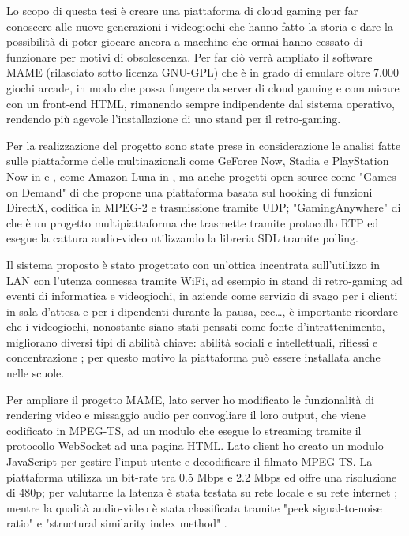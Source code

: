 Lo scopo di questa tesi è creare una piattaforma di cloud gaming per far conoscere alle nuove generazioni i videogiochi che hanno fatto la storia e dare la possibilità di poter giocare ancora a macchine che ormai hanno cessato di funzionare per motivi di obsolescenza. Per far ciò verrà ampliato il software MAME (rilasciato sotto licenza GNU-GPL) che è in grado di emulare oltre 7.000 giochi arcade, in modo che possa fungere da server di cloud gaming e comunicare con un front-end HTML, rimanendo sempre indipendente dal sistema operativo, rendendo più agevole l'installazione di uno stand per il retro-gaming. 

Per la realizzazione del progetto sono state prese in considerazione le analisi fatte sulle piattaforme delle multinazionali come GeForce Now, Stadia e PlayStation Now in \parencite{A_Network_Analysis_on_Cloud_Gaming_Stadia_GeForce_Now_and_PSNow} e \parencite{Network_Analysis_of_the_Sony_Remote_Play_System}, come Amazon Luna in \parencite{Amazon_Luna_WebRTC}, ma anche progetti open source come "Games on Demand" di \parencite{ARealTimeStreamingGamesonDemandSystem} che propone una piattaforma basata sul hooking di funzioni DirectX, codifica in MPEG-2 e trasmissione tramite UDP; "GamingAnywhere" di \parencite{GamingAnywhere} che è un progetto multipiattaforma che trasmette tramite protocollo RTP ed esegue la cattura audio-video utilizzando la libreria SDL tramite polling.

Il sistema proposto è stato progettato con un'ottica incentrata sull'utilizzo in LAN con l'utenza connessa tramite WiFi, ad esempio in stand di retro-gaming ad eventi di informatica e videogiochi, in aziende come servizio di svago per i clienti in sala d'attesa e per i dipendenti durante la pausa, ecc\dots, è importante ricordare che i videogiochi, nonostante siano stati pensati come fonte d'intrattenimento, migliorano diversi tipi di abilità chiave: abilità sociali e intellettuali, riflessi e concentrazione \parencite{Use_of_Cloud_Gaming_in_Education}; per questo motivo la piattaforma può essere installata anche nelle scuole.

Per ampliare il progetto MAME, lato server ho modificato le funzionalità di rendering video e missaggio audio per convogliare il loro output, che viene codificato in MPEG-TS, ad un modulo che esegue lo streaming tramite il protocollo WebSocket ad una pagina HTML. Lato client ho creato un modulo JavaScript per gestire l'input utente e decodificare il filmato MPEG-TS. La piattaforma utilizza un bit-rate tra 0.5 Mbps e 2.2 Mbps ed offre una risoluzione di 480p; per valutarne la latenza è stata testata su rete locale e su rete internet \parencite{Latency_analysis_for_M2M}; mentre la qualità audio-video è stata classificata tramite "peek signal-to-noise ratio" e "structural similarity index method" \parencite{Cloud_Gaming_Architecture_and_Performance}.



